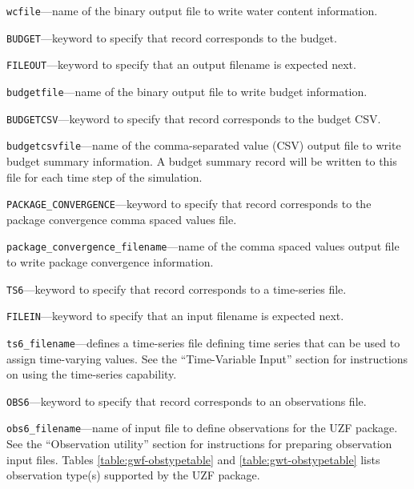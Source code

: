 \begin{description}
\item \texttt{wcfile}---name of the binary output file to write water content information.

\item \texttt{BUDGET}---keyword to specify that record corresponds to the budget.

\item \texttt{FILEOUT}---keyword to specify that an output filename is expected next.

\item \texttt{budgetfile}---name of the binary output file to write budget information.

\item \texttt{BUDGETCSV}---keyword to specify that record corresponds to the budget CSV.

\item \texttt{budgetcsvfile}---name of the comma-separated value (CSV) output file to write budget summary information.  A budget summary record will be written to this file for each time step of the simulation.

\item \texttt{PACKAGE\_CONVERGENCE}---keyword to specify that record corresponds to the package convergence comma spaced values file.

\item \texttt{package\_convergence\_filename}---name of the comma spaced values output file to write package convergence information.

\item \texttt{TS6}---keyword to specify that record corresponds to a time-series file.

\item \texttt{FILEIN}---keyword to specify that an input filename is expected next.

\item \texttt{ts6\_filename}---defines a time-series file defining time series that can be used to assign time-varying values. See the ``Time-Variable Input'' section for instructions on using the time-series capability.

\item \texttt{OBS6}---keyword to specify that record corresponds to an observations file.

\item \texttt{obs6\_filename}---name of input file to define observations for the UZF package. See the ``Observation utility'' section for instructions for preparing observation input files. Tables \ref{table:gwf-obstypetable} and \ref{table:gwt-obstypetable} lists observation type(s) supported by the UZF package.


\end{description}
